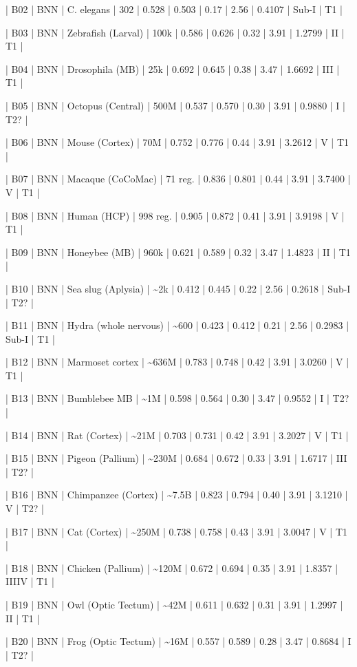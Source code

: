 \documentclass[a4paper,12pt]{article}
\begin{document}
| B02 | BNN | C. elegans | 302 | 0.528 | 0.503 | 0.17 | 2.56 | 0.4107 | Sub-I | T1 |

| B03 | BNN | Zebrafish (Larval) | 100k | 0.586 | 0.626 | 0.32 | 3.91 | 1.2799 | II | T1 |

| B04 | BNN | Drosophila (MB) | 25k | 0.692 | 0.645 | 0.38 | 3.47 | 1.6692 | III | T1 |

| B05 | BNN | Octopus (Central) | 500M | 0.537 | 0.570 | 0.30 | 3.91 | 0.9880 | I | T2? |

| B06 | BNN | Mouse (Cortex) | 70M | 0.752 | 0.776 | 0.44 | 3.91 | 3.2612 | V | T1 |

| B07 | BNN | Macaque (CoCoMac) | 71 reg. | 0.836 | 0.801 | 0.44 | 3.91 | 3.7400 | V | T1 |

| B08 | BNN | Human (HCP) | 998 reg. | 0.905 | 0.872 | 0.41 | 3.91 | 3.9198 | V | T1 |

| B09 | BNN | Honeybee (MB) | 960k | 0.621 | 0.589 | 0.32 | 3.47 | 1.4823 | II | T1 |

| B10 | BNN | Sea slug (Aplysia) | \textasciitilde{}2k | 0.412 | 0.445 | 0.22 | 2.56 | 0.2618 | Sub-I | T2? |

| B11 | BNN | Hydra (whole nervous) | \textasciitilde{}600 | 0.423 | 0.412 | 0.21 | 2.56 | 0.2983 | Sub-I | T1 |

| B12 | BNN | Marmoset cortex | \textasciitilde{}636M | 0.783 | 0.748 | 0.42 | 3.91 | 3.0260 | V | T1 |

| B13 | BNN | Bumblebee MB | \textasciitilde{}1M | 0.598 | 0.564 | 0.30 | 3.47 | 0.9552 | I | T2? |

| B14 | BNN | Rat (Cortex) | \textasciitilde{}21M | 0.703 | 0.731 | 0.42 | 3.91 | 3.2027 | V | T1 |

| B15 | BNN | Pigeon (Pallium) | \textasciitilde{}230M | 0.684 | 0.672 | 0.33 | 3.91 | 1.6717 | III | T2? |

| B16 | BNN | Chimpanzee (Cortex) | \textasciitilde{}7.5B | 0.823 | 0.794 | 0.40 | 3.91 | 3.1210 | V | T2? |

| B17 | BNN | Cat (Cortex) | \textasciitilde{}250M | 0.738 | 0.758 | 0.43 | 3.91 | 3.0047 | V | T1 |

| B18 | BNN | Chicken (Pallium) | \textasciitilde{}120M | 0.672 | 0.694 | 0.35 | 3.91 | 1.8357 | IIIIV | T1 |

| B19 | BNN | Owl (Optic Tectum) | \textasciitilde{}42M | 0.611 | 0.632 | 0.31 | 3.91 | 1.2997 | II | T1 |

| B20 | BNN | Frog (Optic Tectum) | \textasciitilde{}16M | 0.557 | 0.589 | 0.28 | 3.47 | 0.8684 | I | T2? |
\end{document}
